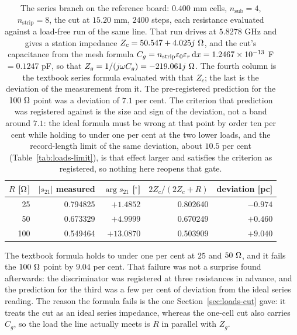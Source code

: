 \begin{table}[H]
  \centering
  \caption{The series branch on the reference board: $0.400$ mm cells, $n_{\mathrm{sub}} = 4$,
  $n_{\mathrm{strip}} = 8$, the cut at $15.20$ mm, $2400$ steps, each resistance evaluated against a load-free
  run of the same line. That run drives at $5.8278$ GHz and gives a station impedance
  $Z_c = 50.547 + 4.025j\ \Omega$, and the cut's capacitance from the mesh formula
  $C_g = n_{\mathrm{strip}}\varepsilon_0\varepsilon_r\,\mathrm{d} x = 1.2467\times10^{-13}$ F $= 0.1247$ pF, so that
  $Z_g = 1/(j\omega C_g) = -219.061j\ \Omega$. The fourth column is the textbook series formula evaluated with that
  $Z_c$; the last is the deviation of the measurement from it. The pre-registered prediction for the
  $100\ \Omega$ point was a deviation of $7.1$ per cent. The criterion that prediction was registered against is
  the size and sign of the deviation, not a band around $7.1$: the ideal formula must be wrong at that point by
  order ten per cent while holding to under one per cent at the two lower loads, and the record-length limit of
  the same deviation, about $10.5$ per cent (Table~\ref{tab:loads-limit}), is that effect larger and satisfies
  the criterion as registered, so nothing here reopens that gate.}
  \label{tab:loads-series}
  \begin{tabular}{@{}rrrrr@{}}
    \toprule
    $R$ [$\Omega$] & $|s_{21}|$ measured & $\arg s_{21}$ [$^\circ$] & $2Z_c/(2Z_c+R)$ & deviation [pc] \\
    \midrule
     25 & 0.794825 & $+1.4852$  & 0.802640 & $-0.974$ \\
     50 & 0.673329 & $+4.9999$  & 0.670249 & $+0.460$ \\
    100 & 0.549464 & $+13.0870$ & 0.503909 & $+9.040$ \\
    \bottomrule
  \end{tabular}
\end{table}

The textbook formula holds to under one per cent at $25$ and $50\ \Omega$, and it fails the $100\ \Omega$ point by
$9.04$ per cent. That failure was not a surprise found afterwards: the discriminator was registered at three
resistances in advance, and the prediction for the third was a few per cent of deviation from the ideal series
reading. The reason the formula fails is the one Section~\ref{sec:loads-cut} gave: it treats the cut as an ideal
series impedance, whereas the one-cell cut also carries $C_g$, so the load the line actually meets is $R$ in
parallel with $Z_g$.

